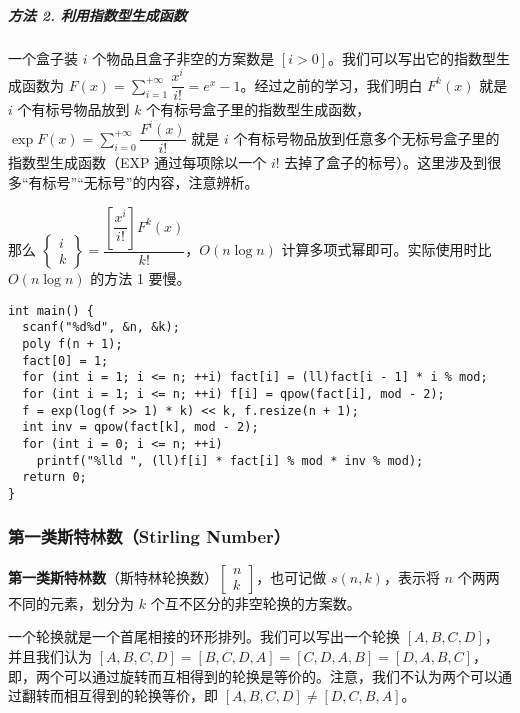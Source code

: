 \documentclass[]{article}
\let\oldsubparagraph\subparagraph
\renewcommand{\subparagraph}[1]{\oldsubparagraph{#1}\mbox{}}
\begin{document}
\hypertarget{ux65b9ux6cd5-2.-ux5229ux7528ux6307ux6570ux578bux751fux6210ux51fdux6570}{%
\subparagraph{方法 2.
利用指数型生成函数}\label{ux65b9ux6cd5-2.-ux5229ux7528ux6307ux6570ux578bux751fux6210ux51fdux6570}}

一个盒子装 \(i\) 个物品且盒子非空的方案数是
\([i>0]\)。我们可以写出它的指数型生成函数为
\(F(x)=\sum\limits_{i=1}^{+\infty}\dfrac{x^i}{i!} = e^x-1\)。经过之前的学习，我们明白
\(F^k(x)\) 就是 \(i\) 个有标号物品放到 \(k\)
个有标号盒子里的指数型生成函数，\(\exp F(x)=\sum\limits_{i=0}^{+\infty}\dfrac{F^i(x)}{i!}\)
就是 \(i\) 个有标号物品放到任意多个无标号盒子里的指数型生成函数（EXP
通过每项除以一个 \(i!\)
去掉了盒子的标号）。这里涉及到很多``有标号''``无标号''的内容，注意辨析。

那么
\(\begin{Bmatrix}i\\k\end{Bmatrix}=\dfrac{\left[\dfrac{x^i}{i!}\right]F^k(x)}{k!}\)，\(O(n\log n)\)
计算多项式幂即可。实际使用时比 \(O(n\log n)\) 的方法 1 要慢。

\begin{verbatim}
int main() {
  scanf("%d%d", &n, &k);
  poly f(n + 1);
  fact[0] = 1;
  for (int i = 1; i <= n; ++i) fact[i] = (ll)fact[i - 1] * i % mod;
  for (int i = 1; i <= n; ++i) f[i] = qpow(fact[i], mod - 2);
  f = exp(log(f >> 1) * k) << k, f.resize(n + 1);
  int inv = qpow(fact[k], mod - 2);
  for (int i = 0; i <= n; ++i)
    printf("%lld ", (ll)f[i] * fact[i] % mod * inv % mod);
  return 0;
}
\end{verbatim}

\hypertarget{ux7b2cux4e00ux7c7bux65afux7279ux6797ux6570stirling-number}{%
\subsubsection{第一类斯特林数（Stirling
Number）}\label{ux7b2cux4e00ux7c7bux65afux7279ux6797ux6570stirling-number}}

\textbf{第一类斯特林数}（斯特林轮换数）\(\begin{bmatrix}n\\ k\end{bmatrix}\)，也可记做
\(s(n,k)\)，表示将 \(n\) 个两两不同的元素，划分为 \(k\)
个互不区分的非空轮换的方案数。

一个轮换就是一个首尾相接的环形排列。我们可以写出一个轮换
\([A,B,C,D]\)，并且我们认为
\([A,B,C,D]=[B,C,D,A]=[C,D,A,B]=[D,A,B,C]\)，即，两个可以通过旋转而互相得到的轮换是等价的。注意，我们不认为两个可以通过翻转而相互得到的轮换等价，即
\([A,B,C,D]\neq[D,C,B,A]\)。
\end{document}
